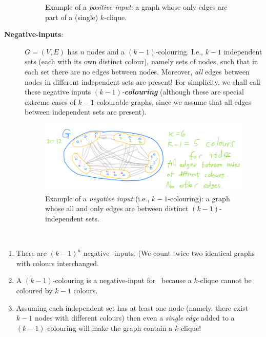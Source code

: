\begin{description}
\begin{figure}[H]
\begin{tikzpicture}[scale=0.6]
\end{tikzpicture}

    
    
    \caption{Example of a \emph{positive input}: a graph whose only edges are part of a (single) $k$-clique.}
    \label{fig:enter-label}
\end{figure}


\item[\textbf{Negative-inputs}:] 

$G=\left(V,E\right)$ has $n$ nodes and a $(k-1)$-colouring. I.e., $k-1$ independent sets (each with its own distinct colour), namely sets of nodes, such that in each set there are no edges between nodes. Moreover,  \emph{all} edges between nodes in  different independent sets are present!
For simplicity, we shall call these negative inputs \emph{$(k-1)$-\textbf{colouring}} (although these are special extreme cases of $k-1$-colourable graphs, since we assume that all edges between independent sets are present). 


\begin{figure}[H]
    \centering
    \includegraphics[width=.6\linewidth]{images/clique2.png}
    \caption{Example of a \emph{negative input} (i.e., $k-1$-colouring): a graph whose all and only edges are between distinct $(k-1)$-independent sets.}
    \label{fig:enter-label}
\end{figure}

\end{description}

\begin{note}\

\begin{enumerate}
\item There are $(k-1)^n$ negative -inputs. (We count twice two identical graphs with colours interchanged.

\item 
 A $(k-1)$-colouring is a negative-input for \cliquenk\ because a $k$-clique cannot be coloured by $k-1$ colours.
\item
 Assuming each independent set has at least one node (namely,
there exist  $k-1$ nodes with different colours) then even a \emph{single} \emph{edge} added to a $(k-1)$-colouring will make the graph contain a $k$-clique!
\end{enumerate}
\end{note}

